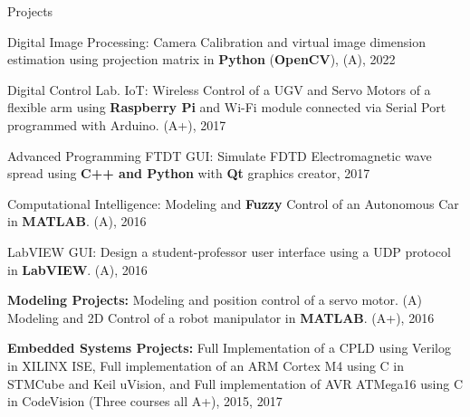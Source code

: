 \begin{cventries}
 
  \cventry
    {} %
    {Projects} %
    {} %
    {} %
    {
      \begin{cvitems} %
        \item{Digital Image Processing: Camera Calibration and virtual image dimension estimation using projection matrix in \textbf{Python} (\textbf{OpenCV}), (A), 2022}
            \item{Digital Control Lab. IoT: Wireless Control of a UGV and Servo Motors of a flexible arm using \textbf{Raspberry Pi} and Wi-Fi module connected via Serial Port programmed with Arduino. (A+), 2017}
            \item{Advanced Programming FTDT GUI: Simulate FDTD Electromagnetic wave spread using \textbf{C++ and Python} with \textbf{Qt} graphics creator, 2017}
            \item{Computational Intelligence: Modeling and \textbf{Fuzzy} Control of an Autonomous Car in \textbf{MATLAB}. (A), 2016}
            \item{LabVIEW GUI: Design a student-professor user interface using a UDP protocol in \textbf{LabVIEW}. (A), 2016}
            \item{\textbf{Modeling Projects:} Modeling and position control of a servo motor. (A)\\ Modeling and 2D Control of a robot manipulator in \textbf{MATLAB}. (A+), 2016}
            \item{\textbf{Embedded Systems Projects:} Full Implementation of a CPLD using Verilog in XILINX ISE, Full implementation of an ARM Cortex M4 using C in STMCube and Keil uVision, and Full implementation of  AVR ATMega16 using C in CodeVision (Three courses all A+), 2015, 2017}
      \end{cvitems}
    }
    
\end{cventries}
